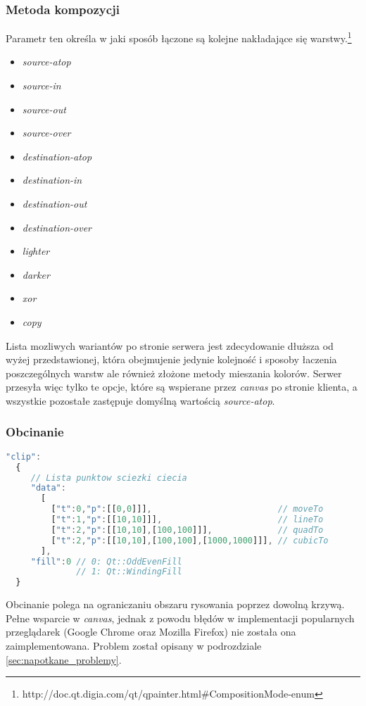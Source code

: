 \subsubsection{Metoda kompozycji}
Parametr ten określa w jaki sposób łączone są kolejne nakładające się warstwy.\footnote{http://doc.qt.digia.com/qt/qpainter.html\#CompositionMode-enum}
\begin{itemize}
\item\emph{ source-atop}
\item \emph{source-in}
\item \emph{source-out}
\item \emph{source-over}
\item \emph{destination-atop}
\item \emph{destination-in}
\item \emph{destination-out}
\item \emph{destination-over}
\item \emph{lighter}
\item \emph{darker}
\item \emph{xor}
\item \emph{copy}
\end{itemize}
Lista mozliwych wariantów po stronie serwera jest zdecydowanie dłuższa od wyżej przedstawionej, która obejmujenie jedynie kolejność i sposoby łaczenia poszczególnych warstw ale również złożone metody mieszania kolorów. Serwer przesyła więc tylko te opcje, które są wspierane przez \emph{canvas} po stronie klienta, a wszystkie pozostałe zastępuje domyślną wartością \emph{source-atop}.

\subsubsection{Obcinanie}
\begin{lstlisting}[language=JavaScript,numbers=none]
"clip":
  {
     // Lista punktow sciezki ciecia
     "data":			
       [
         ["t":0,"p":[[0,0]]],                         // moveTo
         ["t":1,"p":[[10,10]]],                       // lineTo
         ["t":2,"p":[[10,10],[100,100]]],             // quadTo
         ["t":2,"p":[[10,10],[100,100],[1000,1000]]], // cubicTo
       ],
     "fill":0 // 0: Qt::OddEvenFill
              // 1: Qt::WindingFill
  }
\end{lstlisting}
Obcinanie polega na ograniczaniu obszaru rysowania poprzez dowolną krzywą. 
Pełne wsparcie w \emph{canvas}, jednak z powodu błędów w implementacji popularnych przeglądarek (Google Chrome oraz Mozilla Firefox) nie została ona zaimplementowana. Problem został opisany w podrozdziale \ref{sec:napotkane_problemy}.